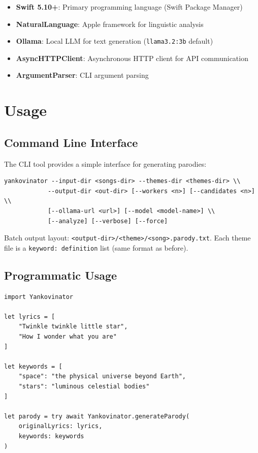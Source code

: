 \documentclass[11pt,a4paper]{article}
\begin{document}
\begin{itemize}
    \item \textbf{Swift 5.10+}: Primary programming language (Swift Package Manager)
    \item \textbf{NaturalLanguage}: Apple framework for linguistic analysis
    \item \textbf{Ollama}: Local LLM for text generation (\texttt{llama3.2:3b} default)
    \item \textbf{AsyncHTTPClient}: Asynchronous HTTP client for API communication
    \item \textbf{ArgumentParser}: CLI argument parsing
\end{itemize}

\section{Usage}

\subsection{Command Line Interface}

The CLI tool provides a simple interface for generating parodies:

\begin{lstlisting}
yankovinator --input-dir <songs-dir> --themes-dir <themes-dir> \\
            --output-dir <out-dir> [--workers <n>] [--candidates <n>] \\
            [--ollama-url <url>] [--model <model-name>] \\
            [--analyze] [--verbose] [--force]
\end{lstlisting}

Batch output layout: \texttt{<output-dir>/<theme>/<song>.parody.txt}. Each theme file is a \texttt{keyword: definition} list (same format as before).

\subsection{Programmatic Usage}

\begin{lstlisting}
import Yankovinator

let lyrics = [
    "Twinkle twinkle little star",
    "How I wonder what you are"
]

let keywords = [
    "space": "the physical universe beyond Earth",
    "stars": "luminous celestial bodies"
]

let parody = try await Yankovinator.generateParody(
    originalLyrics: lyrics,
    keywords: keywords
)
\end{lstlisting}
\end{document}
